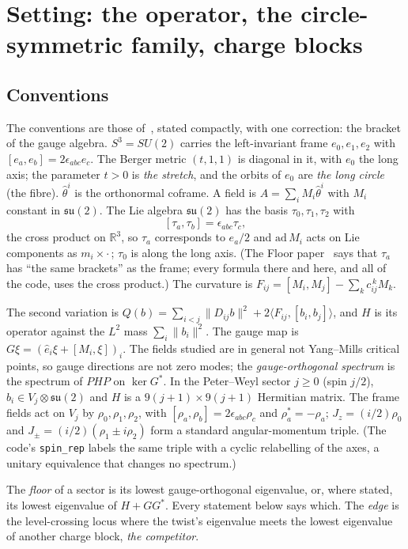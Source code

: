 \documentclass[11pt]{article}
\theoremstyle{definition}
\theoremstyle{remark}
\newcommand{\su}{\mathfrak{su}(2)}
\newcommand{\norm}[1]{\lVert #1\rVert}
\newcommand{\RR}{\mathbb{R}}
\begin{document}
\section{Setting: the operator, the circle-symmetric family, charge blocks}\label{sec:setting}

\subsection{Conventions}\label{subsec:conventions}

The conventions are those of~\cite{davisfloor2026}, stated compactly, with one correction: the bracket of the gauge
algebra. $S^3=SU(2)$ carries the left-invariant frame $e_0,e_1,e_2$ with $[e_a,e_b]=2\epsilon_{abc}e_c$. The Berger
metric $(t,1,1)$ is diagonal in it, with $e_0$ the long axis; the parameter $t>0$ is \emph{the stretch}, and the orbits
of $e_0$ are \emph{the long circle} (the fibre). $\hat\theta^i$ is the orthonormal coframe. A field is
$A=\sum_iM_i\hat\theta^i$ with $M_i$ constant in $\su$. The Lie algebra $\su$ has the basis $\tau_0,\tau_1,\tau_2$ with
\[
  [\tau_a,\tau_b]=\epsilon_{abc}\tau_c ,
\]
the cross product on $\RR^3$, so $\tau_a$ corresponds to $e_a/2$ and $\mathrm{ad}\,M_i$ acts on Lie components as
$m_i\times\cdot\,$; $\tau_0$ is along the long axis. (The Floor paper~\cite{davisfloor2026} says that $\tau_a$ has ``the
same brackets'' as the frame; every formula there and here, and all of the code, uses the cross product.) The curvature
is $F_{ij}=[M_i,M_j]-\sum_kc_{ij}^{\,k}M_k$.

The second variation is $Q(b)=\sum_{i<j}\norm{D_{ij}b}^2+2\langle F_{ij},[b_i,b_j]\rangle$, and $H$ is its operator
against the $L^2$ mass $\sum_i\norm{b_i}^2$. The gauge map is $G\xi=(\hat e_i\xi+[M_i,\xi])_i$. The fields studied are
in general not Yang--Mills critical points, so gauge directions are not zero modes; the \emph{gauge-orthogonal
spectrum} is the spectrum of $PHP$ on $\ker G^*$. In the Peter--Weyl sector $j\ge0$ (spin $j/2$), $b_i\in V_j\otimes\su$
and $H$ is a $9(j+1)\times9(j+1)$ Hermitian matrix. The frame fields act on $V_j$ by $\rho_0,\rho_1,\rho_2$, with
$[\rho_a,\rho_b]=2\epsilon_{abc}\rho_c$ and $\rho_a^*=-\rho_a$; $J_z=(i/2)\rho_0$ and $J_\pm=(i/2)(\rho_1\pm i\rho_2)$
form a standard angular-momentum triple. (The code's \texttt{spin\_rep} labels the same triple with a cyclic relabelling
of the axes, a unitary equivalence that changes no spectrum.)

The \emph{floor} of a sector is its lowest gauge-orthogonal eigenvalue, or, where stated, its lowest eigenvalue of
$H+GG^*$. Every statement below says which. The \emph{edge} is the level-crossing locus where the twist's eigenvalue
meets the lowest eigenvalue of another charge block, \emph{the competitor}.
\end{document}
